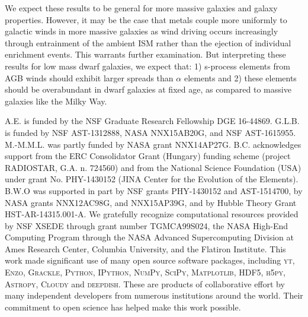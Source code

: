 \documentclass[twocolumn]{aastex61}
\begin{document}
We expect these results to be general for more massive galaxies and galaxy properties. However, it may be the case that metals couple more uniformly to galactic winds in more massive galaxies as wind driving occurs increasingly through entrainment of the ambient ISM rather than the ejection of individual enrichment events. This warrants further examination. But interpreting these results for low mass dwarf galaxies, we expect that: 1) s-process elements from AGB winds should exhibit larger spreads than $\alpha$ elements and 2) these elements should be overabundant in dwarf galaxies at fixed age, as compared to massive galaxies like the Milky Way.




\acknowledgments
A.E. is funded by the NSF Graduate Research Fellowship DGE 16-44869. G.L.B. is funded by NSF AST-1312888, NASA NNX15AB20G, and NSF AST-1615955. M.-M.M.L. was partly funded by NASA  grant NNX14AP27G. B.C. acknowledges support from the ERC Consolidator Grant (Hungary) funding scheme (project RADIOSTAR, G.A. n. 724560) and from the National Science Foundation (USA) under grant No. PHY-1430152 (JINA Center for the Evolution of the Elements). B.W.O was supported in part by NSF grants PHY-1430152 and AST-1514700, by NASA grants NNX12AC98G, and NNX15AP39G, and by Hubble Theory Grant HST-AR-14315.001-A. We gratefully recognize computational resources provided by NSF XSEDE through grant number TGMCA99S024, the NASA High-End Computing Program through the NASA Advanced Supercomputing Division at Ames Research Center, Columbia University, and the Flatiron Institute. This work made significant use of many open source software packages, including \textsc{yt}, \textsc{Enzo}, \textsc{Grackle}, \textsc{Python}, \textsc{IPython}, \textsc{NumPy}, \textsc{SciPy}, \textsc{Matplotlib}, \textsc{HDF5}, \textsc{h5py}, \textsc{Astropy}, \textsc{Cloudy} and \textsc{deepdish}. These are products of collaborative effort by many independent developers from numerous institutions around the world. Their commitment to open science has helped make this work possible. 
\end{document}
